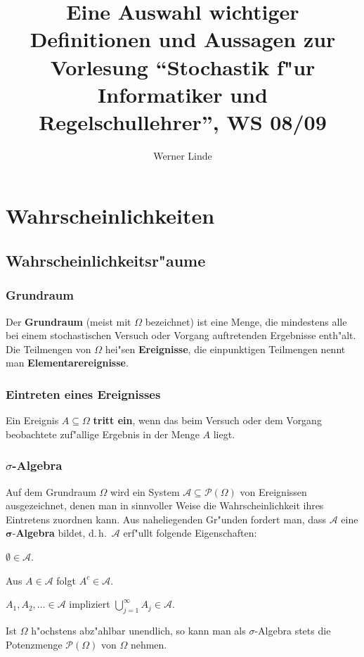 \documentclass[ngerman,draft,parskip=half,twoside]{scrartcl}
\newcommand*{\Algeb}{\mathcal{A}}   %
\newcommand*{\PotM}{\mathcal{P}}    %
\begin{document}
\title{Eine Auswahl wichtiger Definitionen und Aussagen
 zur Vorlesung
  \enquote{Stochastik f"ur Informatiker und Regelschullehrer}, WS 08/09}

\author{Werner Linde}
\maketitle

\section{Wahrscheinlichkeiten}
\subsection{Wahrscheinlichkeitsr"aume}

\subsubsection{Grundraum}
Der \textbf{Grundraum} (meist mit $\Omega$ bezeichnet) ist eine Menge,
die mindestens alle bei einem stochastischen Versuch oder Vorgang
auftretenden Ergebnisse enth"alt. Die Teilmengen von $\Omega$ hei"sen \textbf{Ereignisse},
die einpunktigen Teilmengen nennt man \textbf{Elementarereignisse}.

\subsubsection{Eintreten eines Ereignisses}
Ein Ereignis $A\subseteq \Omega$ \textbf{tritt ein}, wenn das beim Versuch oder dem Vorgang
beobachtete zuf"allige Ergebnis in der Menge
$A$ liegt.

\subsubsection{$\sigma$-Algebra}
Auf dem Grundraum $\Omega$ wird ein System $\Algeb\subseteq \PotM(\Omega)$  von Ereignissen
ausgezeichnet, denen man in sinnvoller Weise die
Wahrscheinlichkeit ihres Eintretens zuordnen kann. Aus naheliegenden Gr"unden fordert man,
dass $\Algeb$ eine $\mathbf \sigma$-\textbf{Algebra} bildet, d.\,h.~$\Algeb$ erf"ullt
folgende Eigenschaften:
\begin{eigenschaften}
 \item $\emptyset\in\Algeb$.
 \item Aus $A\in\Algeb$ folgt $A^c\in \Algeb$.
 \item $A_1,A_2,\ldots\in \Algeb$ impliziert $\bigcup_{j=1}^\infty A_j\in\Algeb$.
\end{eigenschaften}
Ist $\Omega$ h"ochstens abz"ahlbar unendlich, so kann man als $\sigma$-Algebra stets die
Potenzmenge $\PotM(\Omega)$ von $\Omega$ nehmen.
\end{document}

